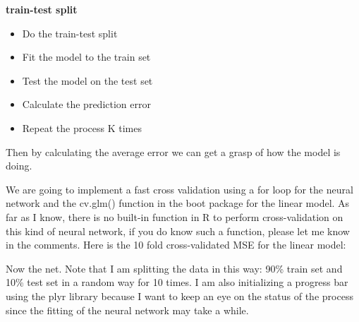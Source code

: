 \documentclass[]{book}
\newenvironment{Shaded}{\begin{snugshade}}{\end{snugshade}}
\newcommand{\CommentTok}[1]{\textcolor[rgb]{0.56,0.35,0.01}{\textit{#1}}}
\newcommand{\DataTypeTok}[1]{\textcolor[rgb]{0.13,0.29,0.53}{#1}}
\newcommand{\DecValTok}[1]{\textcolor[rgb]{0.00,0.00,0.81}{#1}}
\newcommand{\KeywordTok}[1]{\textcolor[rgb]{0.13,0.29,0.53}{\textbf{#1}}}
\newcommand{\NormalTok}[1]{#1}
\newcommand{\OperatorTok}[1]{\textcolor[rgb]{0.81,0.36,0.00}{\textbf{#1}}}
\newcommand{\StringTok}[1]{\textcolor[rgb]{0.31,0.60,0.02}{#1}}
\providecommand{\tightlist}{%
  \setlength{\itemsep}{0pt}\setlength{\parskip}{0pt}}
\begin{document}
\textbf{train-test split}

\begin{itemize}
\tightlist
\item
  Do the train-test split
\item
  Fit the model to the train set
\item
  Test the model on the test set
\item
  Calculate the prediction error
\item
  Repeat the process K times
\end{itemize}

Then by calculating the average error we can get a grasp of how the model is doing.

We are going to implement a fast cross validation using a for loop for the neural network and the cv.glm() function in the boot package for the linear model.
As far as I know, there is no built-in function in R to perform cross-validation on this kind of neural network, if you do know such a function, please let me know in the comments. Here is the 10 fold cross-validated MSE for the linear model:

\begin{Shaded}
\end{Shaded}

Now the net. Note that I am splitting the data in this way: 90\% train set and 10\% test set in a random way for 10 times. I am also initializing a progress bar using the plyr library because I want to keep an eye on the status of the process since the fitting of the neural network may take a while.
\end{document}
